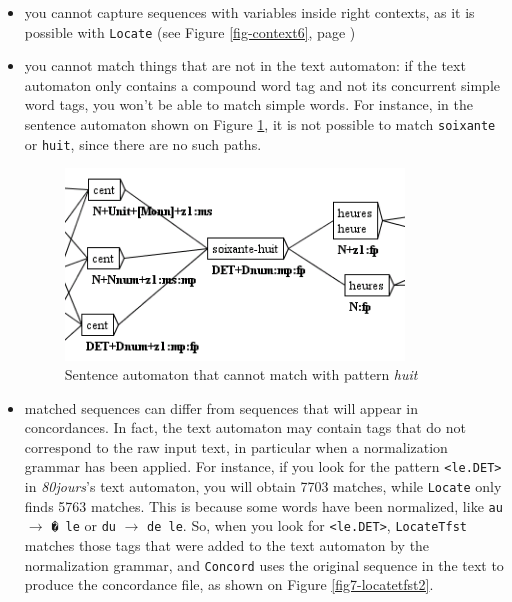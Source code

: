\begin{itemize}
    \item you cannot capture sequences with variables inside right contexts, as
    it is possible with \verb+Locate+ (see Figure \ref{fig-context6},
    page \pageref{fig-context6})
    
    \item you cannot match things that are not in the text automaton: 
    if the text automaton only contains a compound word tag and not
    its concurrent simple word tags, you won't be able to match simple words.
    For instance, in the sentence automaton shown on Figure
    \ref{fig7-locatetfst1}, it is not possible to match \verb+soixante+
    or \verb+huit+, since there are no such paths.
    
\begin{figure}[!ht]
\begin{center}
\includegraphics[width=9cm]{resources/img/fig7-locatetfst1.png}
\caption{Sentence automaton that cannot match with
pattern \textit{huit}\label{fig7-locatetfst1}}
\end{center}
\end{figure}

    \item matched sequences can differ from sequences that will appear in
    concordances. In fact, the text automaton may contain tags that do not
    correspond to the raw input text, in particular when a normalization grammar
    has been applied. For instance, if you look for the pattern \verb+<le.DET>+
    in \textit{80jours}'s text automaton, you will obtain 7703 matches, while
    \verb+Locate+ only finds 5763 matches. This is because some words have been normalized,
    like \verb+au+ $\rightarrow$ \verb+� le+ or \verb+du+ $\rightarrow$
    \verb+de le+. So, when you look for \verb+<le.DET>+, \verb+LocateTfst+
    matches those tags that were added to the text automaton by the
    normalization grammar, and \verb+Concord+ uses the original sequence in the
    text to produce the concordance file, as shown on Figure
    \ref{fig7-locatetfst2}.


\end{itemize}
